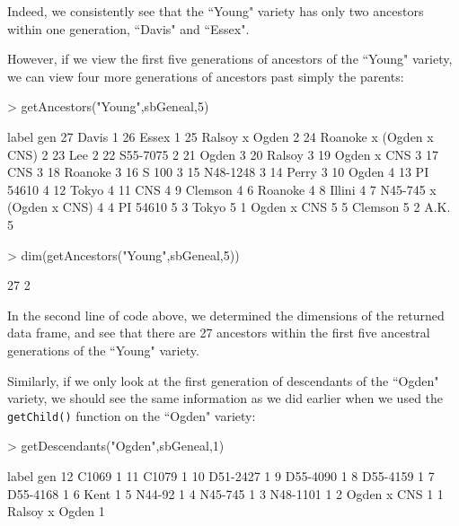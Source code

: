 \documentclass{article}
\numberwithin{equation}{section} %
\begin{document}
Indeed, we consistently see that the ``Young" variety has only two ancestors within one generation, ``Davis" and ``Essex".

However, if we view the first five generations of ancestors of the ``Young" variety, we can view four more generations of ancestors past simply the parents:

\begin{Schunk}
\begin{Sinput}
> getAncestors("Young",sbGeneal,5)
\end{Sinput}
\begin{Soutput}
                     label gen
27                   Davis   1
26                   Essex   1
25          Ralsoy x Ogden   2
24 Roanoke x (Ogden x CNS)   2
23                     Lee   2
22                S55-7075   2
21                   Ogden   3
20                  Ralsoy   3
19             Ogden x CNS   3
17                     CNS   3
18                 Roanoke   3
16                   S 100   3
15                N48-1248   3
14                   Perry   3
10                   Ogden   4
13                PI 54610   4
12                   Tokyo   4
11                     CNS   4
9                  Clemson   4
6                  Roanoke   4
8                   Illini   4
7  N45-745 x (Ogden x CNS)   4
4                 PI 54610   5
3                    Tokyo   5
1              Ogden x CNS   5
5                  Clemson   5
2                     A.K.   5
\end{Soutput}
\begin{Sinput}
> dim(getAncestors("Young",sbGeneal,5))
\end{Sinput}
\begin{Soutput}
[1] 27  2
\end{Soutput}
\end{Schunk}

In the second line of code above, we determined the dimensions of the returned data frame, and see that there are 27 ancestors within the first five ancestral generations of the ``Young" variety.

Similarly, if we only look at the first generation of descendants of the ``Ogden" variety, we should see the same information as we did earlier when we used the \texttt{getChild()} function on the ``Ogden" variety:

\begin{Schunk}
\begin{Sinput}
> getDescendants("Ogden",sbGeneal,1)
\end{Sinput}
\begin{Soutput}
            label gen
12          C1069   1
11          C1079   1
10       D51-2427   1
9        D55-4090   1
8        D55-4159   1
7        D55-4168   1
6            Kent   1
5          N44-92   1
4         N45-745   1
3        N48-1101   1
2     Ogden x CNS   1
1  Ralsoy x Ogden   1
\end{Soutput}
\end{Schunk}
\end{document}
